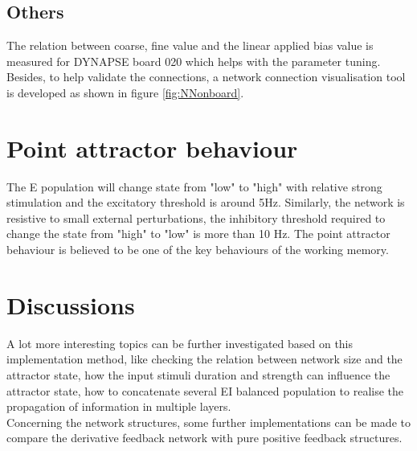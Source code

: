 \subsection*{Others}
The relation between coarse, fine value and the linear applied bias value is measured for DYNAPSE board 020 which helps with the parameter tuning.
Besides, to help validate the connections, a network connection visualisation tool is developed as shown in figure \ref{fig:NNonboard}. 

\section{Point attractor behaviour}
The E population will change state from "low" to "high" with relative strong stimulation and the excitatory threshold is around 5Hz. Similarly, the network is resistive to small external perturbations, the inhibitory threshold required to change the state from "high" to "low" is more than 10 Hz.
The point attractor behaviour is believed to be one of the key behaviours of the working memory.\\

\section{Discussions}

A lot more interesting topics can be further investigated based on this implementation method, like checking the relation between network size and the attractor state, how the input stimuli duration and strength can influence the attractor state, how to concatenate several EI balanced population to realise the propagation of information in multiple layers. \\

Concerning the network structures, some further implementations can be made to compare the derivative feedback network with pure positive feedback structures.